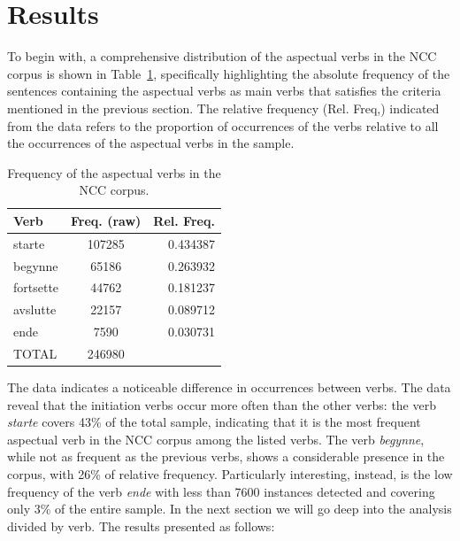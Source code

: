 \documentclass{article}
\begin{document}
\section{Results}
To begin with, a comprehensive distribution of the aspectual verbs in the NCC corpus is shown in Table~\ref{frequency_aspectual_verbs}, specifically highlighting the absolute frequency of the sentences containing the aspectual verbs as main verbs that satisfies the criteria mentioned in the previous section. The relative frequency (Rel. Freq,) indicated from the data refers to the proportion of occurrences of the verbs relative to all the occurrences of the aspectual verbs in the sample. 
\begin{table}[h!]
\begin{center}    
\caption{Frequency of the aspectual verbs in the NCC corpus. }
\label{frequency_aspectual_verbs}
\begin{tabular}{lcr}
\toprule\toprule
Verb &    Freq. (raw) &  Rel. Freq.\\
\hline
 starte &  107285 &               0.434387  \\
begynne &   65186 &               0.263932  \\
 fortsette &   44762 &               0.181237 \\
avslutte &   22157 &               0.089712  \\
 ende &    7590 &               0.030731  \\
  \hline
 TOTAL & 246980\\
\bottomrule
\end{tabular}
\end{center}

\end{table}

\noindent The data indicates a noticeable difference in occurrences between verbs. The data reveal that the initiation verbs occur more often than the other verbs: the verb \emph{starte} covers 43\% of the total sample, indicating that it is the most frequent aspectual verb in the NCC corpus among the listed verbs. The verb \emph{begynne}, while not as frequent as the previous verbs, shows a considerable presence in the corpus, with 26\% of relative frequency. Particularly interesting, instead, is the low frequency of the verb \emph{ende} with less than 7600 instances detected and covering only 3\% of the entire sample. In the next section we will go deep into the analysis divided by verb. The results presented as follows: %
\end{document}
